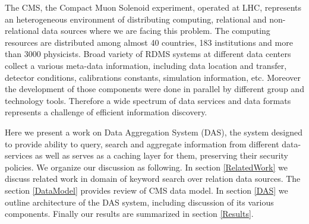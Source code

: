 \documentclass[a4paper]{jpconf}
\begin{document}
The CMS, the Compact Muon Solenoid experiment, operated at LHC,
represents an heterogeneous environment of distributing computing, relational and
non-relational data sources where we are facing this problem. The computing resources
are distributed among almost 40 countries, 183 institutions and more than 3000 physicists.
Broad variety of RDMS systems at different data centers collect a various
meta-data information, including data location and transfer, detector conditions,
calibrations constants, simulation information, etc. Moreover the development
of those components were done in parallel by different group and technology
tools. Therefore a wide spectrum of data services and
data formats represents a challenge of efficient information discovery.

Here we present a work on Data Aggregation System (DAS), the system designed
to provide ability to query, search and aggregate information from different 
data-services as well as serves as a caching layer for them, 
preserving their security policies. We organize
our discussion as following. In section \ref{RelatedWork} we discuss
related work in domain of keyword search over relation data sources.
The section \ref{DataModel} provides review of CMS data model. In section
\ref{DAS} we outline architecture of the DAS system, including discussion of its
various components. Finally our results are summarized in section \ref{Results}.
\end{document}
